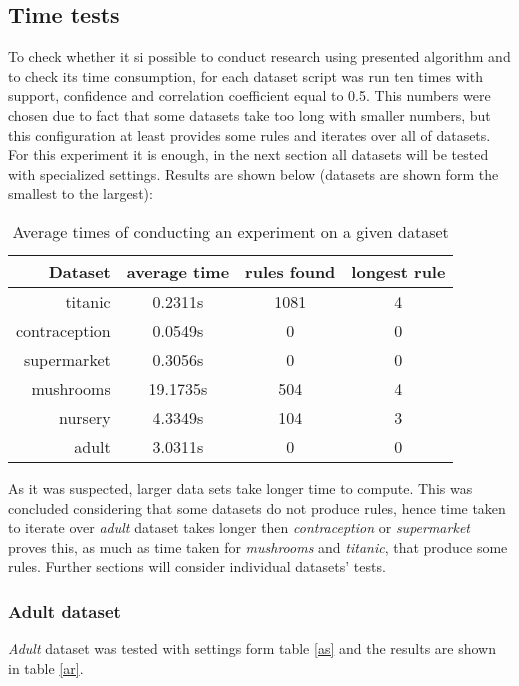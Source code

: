 \documentclass{article}
\begin{document}
	\subsection{Time tests}
	To check whether it si possible to conduct research using presented algorithm and to check its time consumption, for each dataset script was run ten times with support, confidence and correlation coefficient equal to 0.5. This numbers were chosen due to fact that some datasets take too long with smaller numbers, but this configuration at least provides some rules and iterates over all of datasets. For this experiment it is enough, in the next section all datasets will be tested with specialized settings. Results are shown below (datasets are shown form the smallest to the largest):
	\begin{table}[H]
		\centering
		\begin{tabular}{r||c |c |c }
			Dataset&average time&rules found&longest rule\\
			\hline
			\hline
			titanic&0.2311s&1081&4\\
			\hline
			contraception&0.0549s&0&0\\
			\hline
			supermarket&0.3056s&0&0\\
			\hline
			mushrooms&19.1735s&504&4\\
			\hline
			nursery&4.3349s&104&3\\
			\hline
			adult&3.0311s&0&0\\
		\end{tabular}
		\caption{Average times of conducting an experiment on a given dataset}
	\end{table}
	As it was suspected, larger data sets take longer time to compute. This was concluded considering that some datasets do not produce rules, hence time taken to iterate over \textit{adult} dataset takes longer then \textit{contraception} or \textit{supermarket} proves this, as much as time taken for \textit{mushrooms} and \textit{titanic}, that produce some rules. Further sections will consider individual datasets' tests.
	
	
	\subsubsection{Adult dataset}
	\textit{Adult} dataset was tested with settings form table \ref{as} and the results are shown in table \ref{ar}.
	
\end{document}
